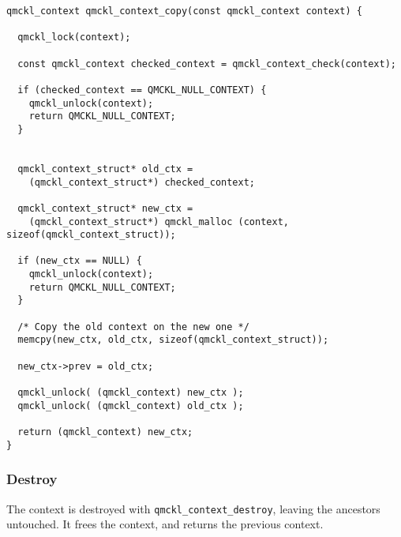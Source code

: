 \begin{verbatim}
qmckl_context qmckl_context_copy(const qmckl_context context) {

  qmckl_lock(context);

  const qmckl_context checked_context = qmckl_context_check(context);

  if (checked_context == QMCKL_NULL_CONTEXT) {
    qmckl_unlock(context);
    return QMCKL_NULL_CONTEXT;
  }

  
  qmckl_context_struct* old_ctx =
    (qmckl_context_struct*) checked_context;

  qmckl_context_struct* new_ctx =
    (qmckl_context_struct*) qmckl_malloc (context, sizeof(qmckl_context_struct));

  if (new_ctx == NULL) {
    qmckl_unlock(context);
    return QMCKL_NULL_CONTEXT;
  }

  /* Copy the old context on the new one */
  memcpy(new_ctx, old_ctx, sizeof(qmckl_context_struct));

  new_ctx->prev = old_ctx;

  qmckl_unlock( (qmckl_context) new_ctx );
  qmckl_unlock( (qmckl_context) old_ctx );
  
  return (qmckl_context) new_ctx;
}

\end{verbatim}
\subsubsection{Destroy}
\label{sec:org55cdc30}

The context is destroyed with \texttt{qmckl\_context\_destroy}, leaving the ancestors untouched.
It frees the context, and returns the previous context.

